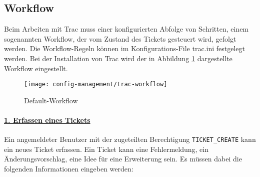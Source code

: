 \subsection{Workflow}
Beim Arbeiten mit Trac muss einer konfigurierten Abfolge von Schritten,
einem sogenannten Workflow, der vom Zustand
des Tickets gesteuert wird, gefolgt werden. Die Workflow-Regeln können im
Konfigurations-File trac.ini festgelegt werden. Bei der
Installation von Trac wird der in Abbildung \ref{fig:trac-workflow}
dargestellte Workflow eingestellt.
\begin{figure}[H]
  \centering
  \texttt{[image: config-management/trac-workflow]}
  \caption{Default-Workflow}
  \label{fig:trac-workflow}
\end{figure}
%
\paragraph{\underline{1. Erfassen eines Tickets}}
Ein angemeldeter Benutzer mit der zugeteilten Berechtigung
\verb+TICKET_CREATE+ kann ein neues Ticket erfassen.
Ein Ticket kann eine Fehlermeldung, ein
  Änderungsvorschlag, eine Idee für eine Erweiterung sein.
  Es müssen dabei die folgenden Informationen
  eingeben werden:
